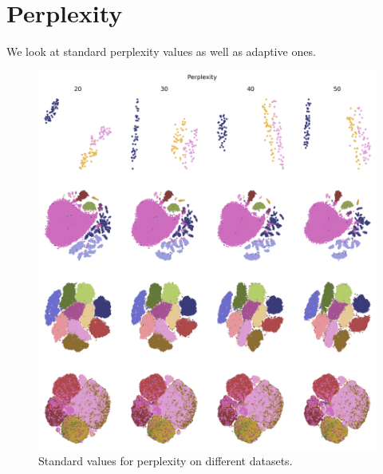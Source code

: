 \section{Perplexity}
We look at standard perplexity values as well as adaptive ones. 
\begin{figure}[h]
    \centering 
        \includegraphics[width=\linewidth]{../code/figures/perp_fixed_embedding_grid_tab20b.png}
        \caption{Standard values for perplexity on different datasets. }
    \label{fig:perp_fixed_grid}
\end{figure}


